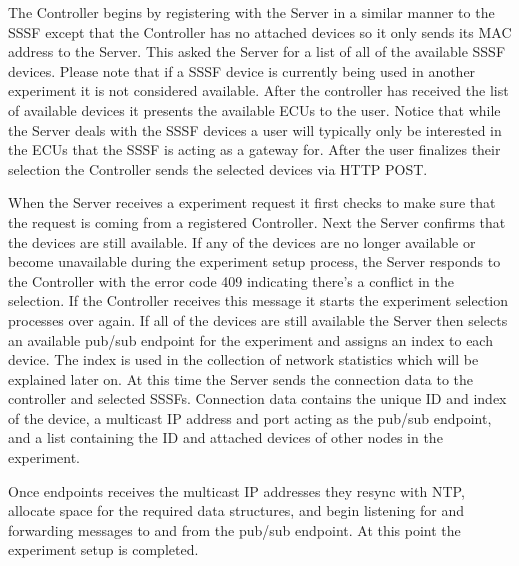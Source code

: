 \documentclass[letterpaper,twocolumn,12pt]{article}
\begin{document}
The Controller begins by registering with the Server in a similar manner to the SSSF except that the Controller has no attached devices so it only sends its MAC address to the Server.
This asked the Server for a list of all of the available SSSF devices. Please note that if a SSSF device is currently being used in another experiment it is not considered available. After the controller has received the list of available devices it presents the available ECUs to the user. Notice that while the Server deals with the SSSF devices a user will typically only be interested in the ECUs that the SSSF is acting as a gateway for. After the user finalizes their selection the Controller sends the selected devices via HTTP POST.

When the Server receives a experiment request it first checks to make sure that the request is coming from a registered Controller. 
Next the Server confirms that the devices are still available. 
If any of the devices are no longer available or become unavailable during the experiment setup process, the Server responds to the Controller with the error code 409 indicating there's a conflict in the selection. 
If the Controller receives this message it starts the experiment selection processes over again. 
If all of the devices are still available the Server then selects an available pub/sub endpoint for the experiment and assigns an index to each device. The index is used in the collection of network statistics which will be explained later on. 
At this time the Server sends the connection data to the controller and selected SSSFs. Connection data contains the unique ID and index of the device, a multicast IP address and port acting as the pub/sub endpoint, and a list containing the ID and attached devices of other nodes in the experiment.

Once endpoints receives the multicast IP addresses they resync with NTP, allocate space for the required data structures, and begin listening for and forwarding messages to and from the pub/sub endpoint. At this point the experiment setup is completed.

\end{document}
